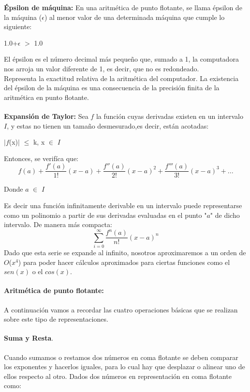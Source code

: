 \documentclass[10pt,a4paper]{article}
\begin{document}
\begin{multicols}{2}
\textbf{\'Epsilon de m\'aquina:}
En una aritm\'etica de punto flotante, se llama \'epsilon de la m\'aquina ($\epsilon$) al menor valor de una determinada máquina que cumple lo siguiente:
\begin{center}
1.0+$\epsilon$ $>$ 1.0
\end{center}
El \'epsilon es el n\'umero decimal más peque\~no que, sumado a 1, la computadora nos arroja un valor diferente de 1, es decir, que no es redondeado.\\
Representa la exactitud relativa de la aritmética del computador. La existencia del \'epsilon de la máquina es una consecuencia de la precisi\'on finita de la aritm\'etica en punto flotante.\\\\
\textbf{Expansi\'on de Taylor:}
Sea $f$ la funci\'on  cuyas derivadas existen en un intervalo $I$, y estas no tienen un tama\~no desmesurado,es decir, est\'an acotadas:
\begin{center}
$|$\(f\)(x)$|$ $\leq$ k,   x \(\in\) $I$
\end{center}
Entonces, se verif\'ica que:\\
\begin{equation}
{f(a)}+\frac{f'(a)}{1!}{(x-a)}+\frac{f''(a)}{2!}{(x-a)^2}+\frac{f'''(a)}{3!}{(x-a)^3}+...
\end{equation}

\begin{center}
Donde $a$ $\in$ $I$
\end{center}
Es decir una funci\'on infinitamente derivable en un intervalo puede representarse como un polinomio a partir de sus derivadas evaluadas en el punto "$a$" de dicho intervalo. De manera más compacta:\\
\begin{equation}
\sum_{i=0}^\infty\frac{{f}^{n}{(a)}}{n!}{(x-a)^{n}}
\end{equation}
Dado que esta serie se expande al infinito, nosotros aproximaremos a un orden de $O$($x^{4}$) para poder hacer c\'alculos aproximados para ciertas funciones como el $sen(x)$ o el $cos(x)$.\\\\
\textbf{Aritm\'etica de punto flotante:}\\\\
A continuaci\'on vamos a recordar las cuatro operaciones b\'asicas que se realizan sobre este tipo de
representaciones.\\\\
\textbf{Suma y Resta}.\\\\
Cuando sumamos o restamos dos n\'umeros en coma flotante se deben comparar los exponentes y
hacerlos iguales, para lo cual hay que desplazar o alinear uno de ellos respecto al otro. Dados dos
números en representaci\'on en coma flotante como:\\


\end{multicols}
\end{document}
